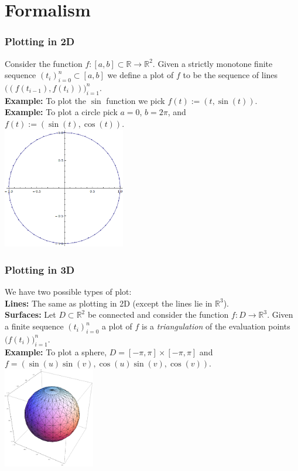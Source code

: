 \documentclass{beamer}
\begin{document}
\section{Formalism}
\begin{frame}
\frametitle{Plotting in 2D}
Consider the function $f : [a,b] \subset \mathbb{R} \to \mathbb{R}^2$.
Given a strictly monotone finite sequence $(t_i)_{i=0}^n \subset [a,b]$ we define a plot of $f$ to be the sequence of lines$\big(\left(f(t_{i-1}), f(t_{i})\right)\big)_{i=1}^n.$
\\ \vspace{0.2cm}
{\bf Example:}
To plot the $\sin$ function we pick $f(t) := (t, \sin(t))$. \\ \vspace{0.2cm}
{\bf Example:}
To plot a circle pick $a = 0$, $b = 2\pi$, and $f(t) := (\sin(t), \cos(t))$. \\
\centering
\includegraphics[width=0.4\textwidth]{circle.png}
\end{frame}

\begin{frame}
\frametitle{Plotting in 3D}
We have two possible types of plot: \\ \vspace{0.2cm}
{\bf Lines:}
The same as plotting in 2D (except the lines lie in $\mathbb{R}^3$). \\ \vspace{0.2cm}
{\bf Surfaces:}
Let $D \subset \mathbb{R}^2$ be connected and consider the function $f : D \to \mathbb{R}^3$.
Given a finite sequence $(t_i)_{i=0}^n$ a plot of $f$ is a \emph{triangulation} of the evaluation points $\big(f(t_i)\big)_{i=1}^n$. \\ \vspace{0.2cm}
{\bf Example:}
To plot a sphere, $D = [-\pi, \pi] \times [-\pi, \pi]$ and $f = (\sin(u) \sin(v), \cos(u) \sin(v), \cos(v))$. \\
\centering
\includegraphics[width=0.3\textwidth]{sphere.png} \\
\end{frame}
\end{document}
